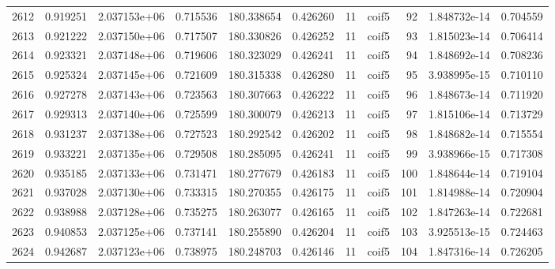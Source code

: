 \begin{tabular}{lrrrrrrlrrr}
2612 &    0.919251 &        2.037153e+06 &  0.715536 &              180.338654 &    0.426260 &      11 &        coif5 &     92 &   1.848732e-14 &      0.704559 \\
2613 &    0.921222 &        2.037150e+06 &  0.717507 &              180.330826 &    0.426252 &      11 &        coif5 &     93 &   1.815023e-14 &      0.706414 \\
2614 &    0.923321 &        2.037148e+06 &  0.719606 &              180.323029 &    0.426241 &      11 &        coif5 &     94 &   1.848692e-14 &      0.708236 \\
2615 &    0.925324 &        2.037145e+06 &  0.721609 &              180.315338 &    0.426280 &      11 &        coif5 &     95 &   3.938995e-15 &      0.710110 \\
2616 &    0.927278 &        2.037143e+06 &  0.723563 &              180.307663 &    0.426222 &      11 &        coif5 &     96 &   1.848673e-14 &      0.711920 \\
2617 &    0.929313 &        2.037140e+06 &  0.725599 &              180.300079 &    0.426213 &      11 &        coif5 &     97 &   1.815106e-14 &      0.713729 \\
2618 &    0.931237 &        2.037138e+06 &  0.727523 &              180.292542 &    0.426202 &      11 &        coif5 &     98 &   1.848682e-14 &      0.715554 \\
2619 &    0.933221 &        2.037135e+06 &  0.729508 &              180.285095 &    0.426241 &      11 &        coif5 &     99 &   3.938966e-15 &      0.717308 \\
2620 &    0.935185 &        2.037133e+06 &  0.731471 &              180.277679 &    0.426183 &      11 &        coif5 &    100 &   1.848644e-14 &      0.719104 \\
2621 &    0.937028 &        2.037130e+06 &  0.733315 &              180.270355 &    0.426175 &      11 &        coif5 &    101 &   1.814988e-14 &      0.720904 \\
2622 &    0.938988 &        2.037128e+06 &  0.735275 &              180.263077 &    0.426165 &      11 &        coif5 &    102 &   1.847263e-14 &      0.722681 \\
2623 &    0.940853 &        2.037125e+06 &  0.737141 &              180.255890 &    0.426204 &      11 &        coif5 &    103 &   3.925513e-15 &      0.724463 \\
2624 &    0.942687 &        2.037123e+06 &  0.738975 &              180.248703 &    0.426146 &      11 &        coif5 &    104 &   1.847316e-14 &      0.726205 \\

\end{tabular}
